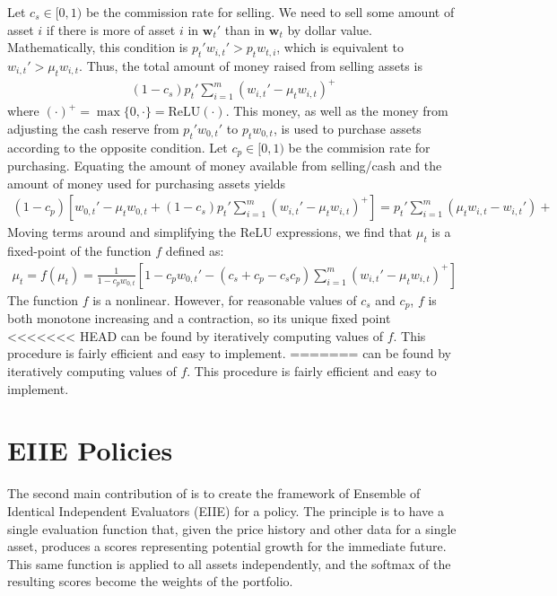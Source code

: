 Let $c_s \in [0, 1)$ be the commission rate for selling. We need to sell some amount of asset $i$ if 
there is more of asset $i$ in $\mathbf w_t'$ than in $\mathbf w_t$ by dollar value. Mathematically, this condition
is $p_t' w_{i,t}' > p_t w_{t,i}$, which is equivalent to $w_{i,t}' > \mu_t w_{i,t}$. Thus, the total amount of
money raised from selling assets is
\begin{align*}
  (1-c_s) p_t' \sum_{i=1}^m (w_{i,t}' - \mu_t w_{i,t})^+
\end{align*}
where $(\cdot)^+ = \max\{0, \cdot\} = \mathrm{ReLU}(\cdot)$. This money, as well as the money from adjusting the cash reserve
from $p_t' w_{0,t}'$ to $p_t w_{0,t}$, is used to purchase assets according to the opposite condition.
Let $c_p \in [0, 1)$ be the commision rate for purchasing. Equating the amount of money available from selling/cash and the amount of money
used for purchasing assets yields
\begin{align*}
  (1-c_p)\left[ w_{0,t}' - \mu_t w_{0,t} + (1-c_s) p_t' \sum_{i=1}^m (w_{i,t}' - \mu_t w_{i,t})^+ \right] = p_t'\sum_{i=1}^m (\mu_t w_{i,t} - w_{i,t}')+
\end{align*}
Moving terms around and simplifying the ReLU expressions, we find that $\mu_t$ is a fixed-point of the function $f$ defined as:
\begin{align*}
  \mu_t = f(\mu_t) = \frac{1}{1 - c_p w_{0,t}}\left[ 1 - c_p w_{0,t}' - (c_s + c_p - c_s c_p) \sum_{i=1}^m (w_{i,t}' - \mu_t w_{i,t})^+ \right]
\end{align*}
The function $f$ is a nonlinear. However, for reasonable values of $c_s$ and $c_p$, $f$ is both monotone increasing and a contraction, so its unique fixed point
<<<<<<< HEAD
can be found by iteratively computing values of $f$. This procedure is fairly efficient and easy to implement.
=======
can be found by iteratively computing values of $f$. This procedure is fairly efficient and easy to implement.



\section{EIIE Policies}
The second main contribution of \cite{drl_framework} is to create the framework of
Ensemble of Identical Independent Evaluators (EIIE) for a policy.
The principle is to have a single evaluation function that, given the price history and other data for a single asset,
produces a scores representing potential growth for the immediate future. This same function is
applied to all assets independently, and the softmax of the resulting scores become the weights of the portfolio.

